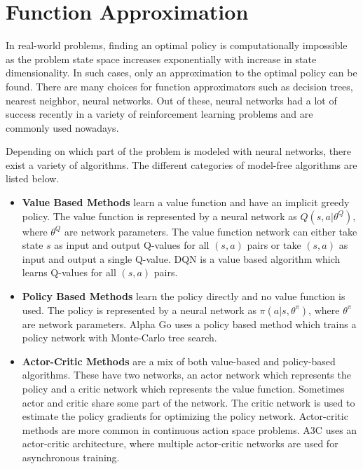 \section{Function Approximation}
In real-world problems, finding an optimal policy is computationally impossible as the problem state space increases exponentially with increase in state dimensionality. In such cases, only an approximation to the optimal policy can be found. There are many choices for function approximators such as decision trees, nearest neighbor, neural networks. Out of these, neural networks had a lot of success recently in a variety of reinforcement learning problems and are commonly used nowadays.

Depending on which part of the problem is modeled with neural networks, there exist a variety of algorithms. The different categories of model-free algorithms are listed below.

\begin{itemize}
\item \textbf{Value Based Methods} learn a value function and have an implicit greedy policy. The value function is represented by a neural network as $Q(s,a|\theta^Q)$, where $\theta^Q$ are network parameters. The value function network can either take state $s$ as input and output Q-values for all $(s,a)$ pairs or take $(s,a)$ as input and output a single Q-value. DQN \cite{01_dqn} is a value based algorithm which learns Q-values for all $(s,a)$ pairs.

\item \textbf{Policy Based Methods} learn the policy directly and no value function is used. The policy is represented by a neural network as $\pi(a|s,\theta^\pi)$, where $\theta^\pi$ are network parameters. Alpha Go \cite{Silver_2016} uses a policy based method which trains a policy network with Monte-Carlo tree search. 

\item \textbf{Actor-Critic Methods} are a mix of both value-based and policy-based algorithms. These have two networks, an actor network which represents the policy and a critic network which represents the value function. Sometimes actor and critic share some part of the network. The critic network is used to estimate the policy gradients for optimizing the policy network. Actor-critic methods are more common in continuous action space problems. A3C \cite{a3c} uses an actor-critic architecture, where multiple actor-critic networks are used for asynchronous training.

\end{itemize}


